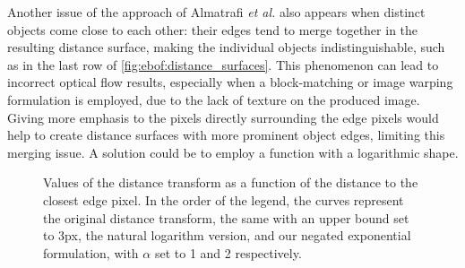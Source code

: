 Another issue of the approach of Almatrafi \textit{et al.} also appears when distinct objects come close to each other: their edges tend to merge together in the resulting distance surface, making the individual objects indistinguishable, such as in the last row of \cref{fig:ebof:distance_surfaces}. This phenomenon can lead to incorrect optical flow results, especially when a block-matching or image warping formulation is employed, due to the lack of texture on the produced image. Giving more emphasis to the pixels directly surrounding the edge pixels would help to create distance surfaces with more prominent object edges, limiting this merging issue. A solution could be to employ a function with a logarithmic shape.

\begin{figure}[t]
  \centering
\caption{Values of the distance transform as a function of the distance to the closest edge pixel. In the order of the legend, the curves represent the original distance transform, the same with an upper bound set to 3px, the natural logarithm version, and our negated exponential formulation, with \(\alpha \) set to 1 and 2 respectively.}\label{fig:ebof:distance_surface_plot}
\end{figure}

